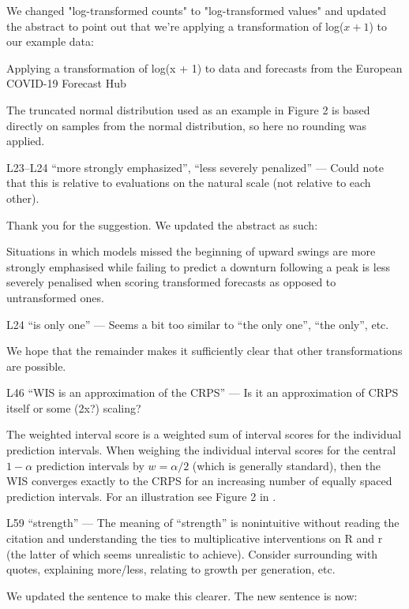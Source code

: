 \documentclass{article}
\newcommand{\black}{\color{black}}
\newcommand{\blue}{\color{blue}}
\newcommand{\indented}{\setlength{\leftskip}{1cm}}
\newcommand{\notindented}{\setlength{\leftskip}{0cm}}
\begin{document}
\black
We changed "log-transformed counts" to "log-transformed values" and updated the abstract to point out that we're applying a transformation of log($x + 1$) to our example data: 

\indented
Applying a transformation of log(x + 1) to data and forecasts from the European COVID-19 Forecast Hub

\notindented

The truncated normal distribution used as an example in Figure 2 is based directly on samples from the normal distribution, so here no rounding was applied. 

\blue
L23–L24 “more strongly emphasized”, “less severely penalized” — Could note that this is relative to evaluations on the natural scale (not relative to each other).

\black
Thank you for the suggestion. We updated the abstract as such: 

\indented
Situations in which models missed the beginning of upward swings are more strongly emphasised while failing to predict a downturn following a peak is less severely penalised when scoring transformed forecasts as opposed to untransformed ones.

\notindented

\blue
L24 “is only one” — Seems a bit too similar to “the only one”, “the only”, etc.

\black
We hope that the remainder makes it sufficiently clear that other transformations are possible. 

\blue
L46 “WIS is an approximation of the CRPS” — Is it an approximation of CRPS itself or some (2x?) scaling?

\black
The weighted interval score is a weighted sum of interval scores for the individual prediction intervals. When weighing the individual interval scores for the central $1 - \alpha$ prediction intervals by 
$w = \alpha / 2$ (which is generally standard), then the WIS converges exactly to the CRPS for an increasing number of equally spaced prediction intervals. For an illustration see Figure 2 in \cite{bracherEvaluatingEpidemicForecasts2021}.

\blue
L59 “strength” — The meaning of “strength” is nonintuitive without reading the citation and understanding the ties to multiplicative interventions on R and r (the latter of which seems unrealistic to achieve). Consider surrounding with quotes, explaining more/less, relating to growth per generation, etc.

\black
We updated the sentence to make this clearer. The new sentence is now: 
\end{document}
